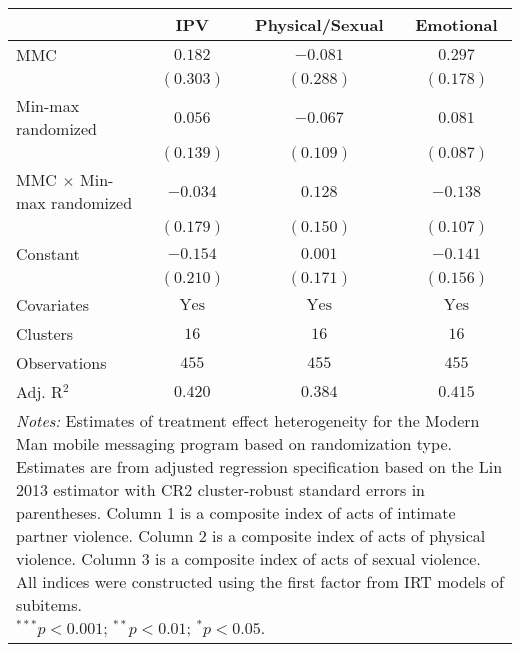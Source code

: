 
\begin{tabular}{l c c c}
\toprule
 & IPV & Physical/Sexual & Emotional \\
\midrule
MMC                             & $0.182$        & $-0.081$       & $0.297$        \\
                                & $(0.303)$      & $(0.288)$      & $(0.178)$      \\
Min-max randomized              & $0.056$        & $-0.067$       & $0.081$        \\
                                & $(0.139)$      & $(0.109)$      & $(0.087)$      \\
MMC $\times$ Min-max randomized & $-0.034$       & $0.128$        & $-0.138$       \\
                                & $(0.179)$      & $(0.150)$      & $(0.107)$      \\
Constant                        & $-0.154$       & $0.001$        & $-0.141$       \\
                                & $(0.210)$      & $(0.171)$      & $(0.156)$      \\
\midrule
Covariates                      & $\textrm{Yes}$ & $\textrm{Yes}$ & $\textrm{Yes}$ \\
Clusters                        & $16$           & $16$           & $16$           \\
Observations                    & $455$          & $455$          & $455$          \\
Adj. R$^2$                      & $0.420$        & $0.384$        & $0.415$        \\
\bottomrule
\multicolumn{4}{l}{\scriptsize{\parbox{\linewidth}{\vspace{2pt} 
       \textit{Notes:} Estimates of treatment effect heterogeneity for the Modern Man mobile 
       messaging program based on randomization type. Estimates are from adjusted regression 
       specification based on the Lin 2013 estimator with CR2 cluster-robust 
       standard errors in parentheses. Column 1 is a composite index of 
       acts of intimate partner violence. Column 2 is a composite index of acts
       of physical violence. Column 3 is a composite index of acts of sexual violence.
       All indices were constructed using the first factor from IRT models of subitems. 
      \\ $^{***}p<0.001$; $^{**}p<0.01$; $^{*}p<0.05$.}}}
\end{tabular}

